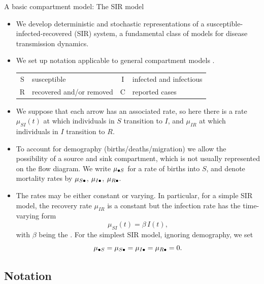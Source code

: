 \begin{frame}[allowframebreaks=0.8]{A basic compartment model: The SIR model}

  \begin{itemize}
  \item
    We develop deterministic and stochastic representations of a susceptible-infected-recovered (SIR) system, a fundamental class of models for disease transmission dynamics.
  \item
    We set up  notation applicable to general compartment models \citep{breto09}.
    
    \vspace{5mm}
    \begin{tabular}{c @{\ :\ } l c @{\ :\ } l}
      S & susceptible & I & infected and infectious  \\
      R & recovered and/or removed  & C & reported cases
    \end{tabular}
  \item We suppose that each arrow has an associated rate, so here there is a rate $\mu_{SI}(t)$ at which individuals in $S$ transition to $I$, and $\mu_{IR}$ at which individuals in $I$ transition to $R$. 
  \item To account for demography (births/deaths/migration) we allow the possibility of a source and sink compartment, which is not usually represented on the flow diagram. We write $\mu_{{\small{\bullet}}S}$ for a rate of births into $S$, and denote mortality rates by $\mu_{S{\small\bullet}}$, $\mu_{I{\small\bullet}}$, $\mu_{R{\small\bullet}}$.
  \item The rates may be either constant or varying. In particular, for a simple SIR model, the recovery rate $\mu_{IR}$ is a constant but the infection rate has the time-varying form
    $$\mu_{SI}(t)=\beta \, I(t),$$
    with $\beta$ being the . For the simplest SIR model, ignoring demography, we set
    $$ \mu_{{\small{\bullet}}S}=\mu_{S{\small{\bullet}}}=\mu_{I{\small{\bullet}}}=\mu_{R{\small{\bullet}}}=0.$$
  \end{itemize}
\end{frame}

\subsection{Notation}

